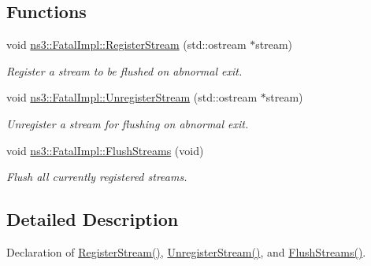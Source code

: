 \subsection*{Functions}
\begin{DoxyCompactItemize}
\item 
void \hyperlink{group__fatalimpl_gad552ca3d6d85b95147b8c6a2eb4d4579}{ns3\+::\+Fatal\+Impl\+::\+Register\+Stream} (std\+::ostream $\ast$stream)
\begin{DoxyCompactList}\small\item\em Register a stream to be flushed on abnormal exit. \end{DoxyCompactList}\item 
void \hyperlink{group__fatalimpl_ga2bf70e98e990f01912527b4ccfac27d0}{ns3\+::\+Fatal\+Impl\+::\+Unregister\+Stream} (std\+::ostream $\ast$stream)
\begin{DoxyCompactList}\small\item\em Unregister a stream for flushing on abnormal exit. \end{DoxyCompactList}\item 
void \hyperlink{group__fatalimpl_gad96fb19ef26235aaccd15e6d2a72382f}{ns3\+::\+Fatal\+Impl\+::\+Flush\+Streams} (void)
\begin{DoxyCompactList}\small\item\em Flush all currently registered streams. \end{DoxyCompactList}\end{DoxyCompactItemize}


\subsection{Detailed Description}
Declaration of \hyperlink{group__fatalimpl_gad552ca3d6d85b95147b8c6a2eb4d4579}{Register\+Stream()}, \hyperlink{group__fatalimpl_ga2bf70e98e990f01912527b4ccfac27d0}{Unregister\+Stream()}, and \hyperlink{group__fatalimpl_gad96fb19ef26235aaccd15e6d2a72382f}{Flush\+Streams()}. 

